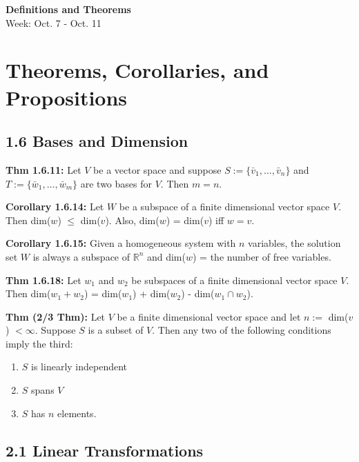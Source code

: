 \noindent
\textbf{\LARGE Definitions and Theorems} \\
\large Week: Oct. 7 - Oct. 11

\normalsize

\section*{Theorems, Corollaries, and Propositions}

\subsection*{1.6 Bases and Dimension}

\textbf{Thm 1.6.11:} Let $V$ be a vector space and suppose $S := \{\bar v_1, \ldots , \bar v_n \}$ and $T := \{\bar w_1, \ldots , \bar w_m\}$ are two bases for $V$. Then $m = n$. 

\bigskip 

\noindent 
\textbf{Corollary 1.6.14:} Let $W$ be a subspace of a finite dimensional vector space $V$. Then dim($w$) $\le$ dim($v$). Also, dim($w$) = dim($v$) iff $w = v$.

\bigskip  

\noindent 
\textbf{Corollary 1.6.15:} Given a homogeneous system with $n$ variables, the solution set $W$ is always a subspace of $\mathbb{R} ^n$ and dim($w$) = the number of free variables. 

\bigskip 

\noindent 
\textbf{Thm 1.6.18:} Let $w_1$ and $w_2$ be subspaces of a finite dimensional vector space $V$. \\
Then dim($w_1 + w_2$) = dim($w_1$) + dim($w_2$) - dim($w_1 \cap w_2$).

\bigskip 

\noindent 
\textbf{Thm (2/3 Thm):} Let $V$ be a finite dimensional vector space and let $n := $ dim($v$) $< \infty$. Suppose $S$ is a subset of $V$. Then any two of the following conditions imply the third:
\begin{enumerate}
    \item $S$ is linearly independent
    \item $S$ spans $V$
    \item $S$ has $n$ elements.
\end{enumerate}

\subsection*{2.1 Linear Transformations}

